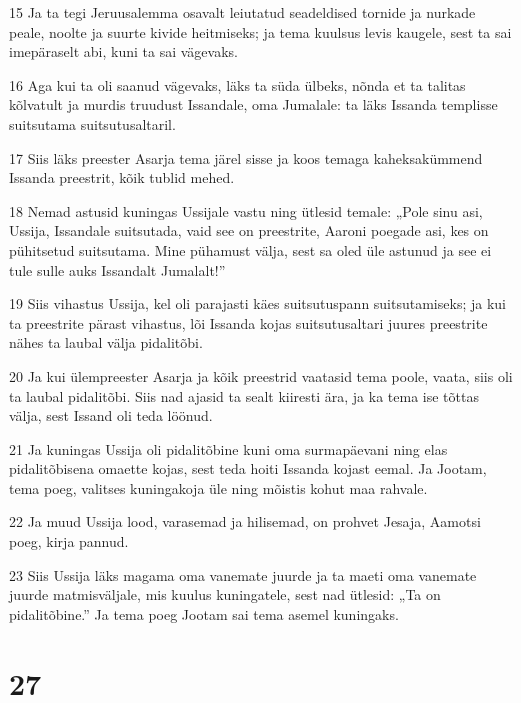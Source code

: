 \par 15 Ja ta tegi Jeruusalemma osavalt leiutatud seadeldised tornide ja nurkade peale, noolte ja suurte kivide heitmiseks; ja tema kuulsus levis kaugele, sest ta sai imepäraselt abi, kuni ta sai vägevaks.
\par 16 Aga kui ta oli saanud vägevaks, läks ta süda ülbeks, nõnda et ta talitas kõlvatult ja murdis truudust Issandale, oma Jumalale: ta läks Issanda templisse suitsutama suitsutusaltaril.
\par 17 Siis läks preester Asarja tema järel sisse ja koos temaga kaheksakümmend Issanda preestrit, kõik tublid mehed.
\par 18 Nemad astusid kuningas Ussijale vastu ning ütlesid temale: „Pole sinu asi, Ussija, Issandale suitsutada, vaid see on preestrite, Aaroni poegade asi, kes on pühitsetud suitsutama. Mine pühamust välja, sest sa oled üle astunud ja see ei tule sulle auks Issandalt Jumalalt!”
\par 19 Siis vihastus Ussija, kel oli parajasti käes suitsutuspann suitsutamiseks; ja kui ta preestrite pärast vihastus, lõi Issanda kojas suitsutusaltari juures preestrite nähes ta laubal välja pidalitõbi.
\par 20 Ja kui ülempreester Asarja ja kõik preestrid vaatasid tema poole, vaata, siis oli ta laubal pidalitõbi. Siis nad ajasid ta sealt kiiresti ära, ja ka tema ise tõttas välja, sest Issand oli teda löönud.
\par 21 Ja kuningas Ussija oli pidalitõbine kuni oma surmapäevani ning elas pidalitõbisena omaette kojas, sest teda hoiti Issanda kojast eemal. Ja Jootam, tema poeg, valitses kuningakoja üle ning mõistis kohut maa rahvale.
\par 22 Ja muud Ussija lood, varasemad ja hilisemad, on prohvet Jesaja, Aamotsi poeg, kirja pannud.
\par 23 Siis Ussija läks magama oma vanemate juurde ja ta maeti oma vanemate juurde matmisväljale, mis kuulus kuningatele, sest nad ütlesid: „Ta on pidalitõbine.” Ja tema poeg Jootam sai tema asemel kuningaks.

\chapter{27}

